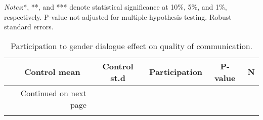\documentclass[10pt,a4paper, margin=1in]{article}
\begin{document}
\begin{center}
	{\tiny \tabcolsep=1pt  %
		\begin{ThreePartTable}
			\begin{TableNotes}[flushleft]
				\tiny
				\item \textit{Notes}:*, **, and *** denote statistical significance at 10\%, 5\%, and 1\%, respectively. P-value not adjusted for multiple hypothesis testing. Robust standard errors.
			\end{TableNotes}
			\begin{longtable}{l*{5}{c}}
				\caption{Participation to gender dialogue effect on quality of communication.}\label{tab:balance_omni}					\\
				\toprule
				\hline 
				&\multicolumn{1}{p{1cm}}{\centering Control mean}
				&\multicolumn{1}{p{1cm}}{\centering Control st.d}
				&\multicolumn{1}{p{2cm}}{\centering Participation}
				&\multicolumn{1}{p{1cm}}{\centering P-value}
				&\multicolumn{1}{p{1cm}}{\centering N} \\
				\hline 
				\endfirsthead
				\hline
				\endhead
				\hline
				\multicolumn{2}{r}{{Continued on next page}} \\
				\endfoot
				
				\bottomrule
				\insertTableNotes
				\endlastfoot
				
			\end{longtable}
		\end{ThreePartTable}
	}
\end{center}
\end{document}
